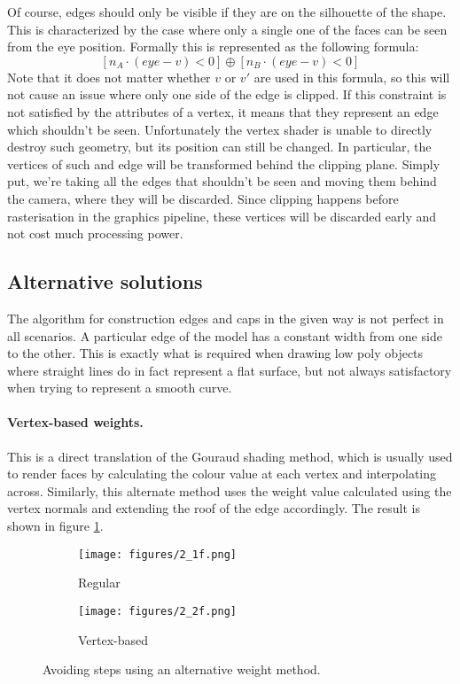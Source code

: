 \documentclass[a4paper, 12pt]{article}
\begin{document}
Of course, edges should only be visible if they are on the silhouette of the shape. This is characterized by the case where only a single one of the faces can be seen from the eye position. Formally this is represented as the following formula:
$$[n_A \cdot (eye-v) < 0] \oplus [n_B \cdot (eye-v) < 0]$$
Note that it does not matter whether $v$ or $v'$ are used in this formula, so this will not cause an issue where only one side of the edge is clipped. If this constraint is not satisfied by the attributes of a vertex, it means that they represent an edge which shouldn't be seen. Unfortunately the vertex shader is unable to directly destroy such geometry, but its position can still be changed. In particular, the vertices of such and edge will be transformed behind the clipping plane. Simply put, we're taking all the edges that shouldn't be seen and moving them behind the camera, where they will be discarded. Since clipping happens before rasterisation in the graphics pipeline, these vertices will be discarded early and not cost much processing power.


\subsection{Alternative solutions}
The algorithm for construction edges and caps in the given way is not perfect in all scenarios. A particular edge of the model has a constant width from one side to the other. This is exactly what is required when drawing low poly objects where straight lines do in fact represent a flat surface, but not always satisfactory when trying to represent a smooth curve.

\paragraph{Vertex-based weights.}
This is a direct translation of the Gouraud shading method, which is usually used to render faces by calculating the colour value at each vertex and interpolating across. Similarly, this alternate method uses the weight value calculated using the vertex normals and extending the roof of the edge accordingly. The result is shown in figure \ref{smooth}.

\begin{figure}[htbp!]
  \centering
  \begin{subfigure}{0.3\columnwidth}
    \texttt{[image: figures/2\_1f.png]}
    \caption{Regular}
  \end{subfigure}
  \begin{subfigure}{0.3\columnwidth}
    \texttt{[image: figures/2\_2f.png]}
    \caption{Vertex-based}
  \end{subfigure}
  \caption{Avoiding steps using an alternative weight method.}
  \label{smooth}
\end{figure}
\end{document}
